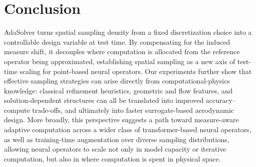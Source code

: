 \section{Conclusion}
\label{sec:conclusion}
AdaSolver turns spatial sampling density from a fixed discretization choice into a controllable design variable at test time. By compensating for the induced measure shift, it decouples where computation is allocated from the reference operator being approximated, establishing spatial sampling as a new axis of test-time scaling for point-based neural operators. Our experiments further show that effective sampling strategies can arise directly from computational-physics knowledge: classical refinement heuristics, geometric and flow features, and solution-dependent structures can all be translated into improved accuracy–compute trade-offs, and ultimately into faster surrogate-based aerodynamic design. More broadly, this perspective suggests a path toward measure-aware adaptive computation across a wider class of transformer-based neural operators, as well as training-time augmentation over diverse sampling distributions, allowing neural operators to scale not only in model capacity or iterative computation, but also in where computation is spent in physical space.